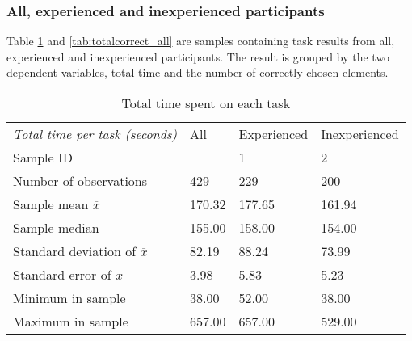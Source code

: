 

\subsubsection{All,  experienced and inexperienced participants}\label{sec:alltasks}

Table \ref{tab:totaltime_all} and \ref{tab:totalcorrect_all} are samples containing task results from all, experienced and inexperienced participants. The result is grouped by the two dependent variables, total time and the number of correctly chosen elements.

\begin{table}[H]
	\centering
	\begin{tabular}{l|l|l|l}
		\textit{Total time per task (seconds) } & All  & Experienced & Inexperienced \\ 
		Sample ID &   & 1  & 2   \\ \hline
		Number of observations & 429    & 229    & 200   \\
		Sample mean $\overline{x}$     & 170.32 & 177.65  & 161.94     \\
		Sample median  & 155.00 & 158.00  & 154.00  \\
		Standard deviation of $\overline{x}$  & 82.19  & 88.24  & 73.99   \\
		Standard error of $\overline{x}$  & 3.98  & 5.83 & 5.23  \\
		Minimum in sample & 38.00  & 52.00  & 38.00     \\
		Maximum in sample & 657.00 & 657.00  & 529.00    \\ \hline
	\end{tabular}
	\caption[Total time, all participants]{Total time spent on each task}
	\label{tab:totaltime_all}
\end{table}

